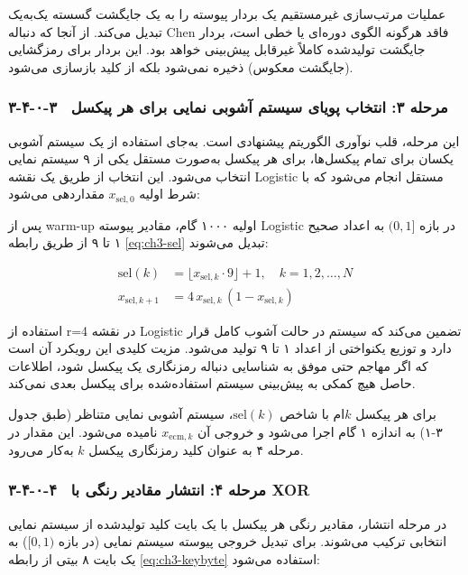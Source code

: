 عملیات مرتب‌سازی غیرمستقیم یک بردار پیوسته را به یک جایگشت گسسته یک‌به‌یک تبدیل می‌کند. از آنجا که دنباله ‎Chen‎ فاقد هرگونه الگوی دوره‌ای یا خطی است، بردار جایگشت تولیدشده کاملاً غیرقابل پیش‌بینی خواهد بود.  این بردار برای رمزگشایی (جایگشت معکوس) ذخیره نمی‌شود بلکه از کلید بازسازی می‌شود.

\subsubsection{۳-۴-۰-۳  مرحله ۳: انتخاب پویای سیستم آشوبی نمایی برای هر پیکسل}

این مرحله، قلب نوآوری الگوریتم پیشنهادی است. به‌جای استفاده از یک سیستم آشوبی یکسان برای تمام پیکسل‌ها، برای هر پیکسل به‌صورت مستقل یکی از ۹ سیستم نمایی انتخاب می‌شود. این انتخاب از طریق یک نقشه ‎Logistic‎ مستقل انجام می‌شود که با شرط اولیه $x_{\mathrm{sel},0}$ مقداردهی می‌شود:

پس از ‎warm-up‎ اولیه ۱۰۰۰ گام، مقادیر پیوسته ‎Logistic‎ در بازه $(0,1]$ به اعداد صحیح ۱ تا ۹ از طریق رابطه \eqref{eq:ch3-sel} تبدیل می‌شوند:

\begin{align}
\mathrm{sel}(k) &= \lfloor x_{\mathrm{sel},k} \cdot 9 \rfloor + 1, \quad k=1,2,\ldots,N \\
x_{\mathrm{sel},k+1} &= 4\,x_{\mathrm{sel},k}\,(1-x_{\mathrm{sel},k})
\label{eq:ch3-sel}
\end{align}

استفاده از ‎r=4‎ در نقشه ‎Logistic‎ تضمین می‌کند که سیستم در حالت آشوب کامل قرار دارد و توزیع یکنواختی از اعداد ۱ تا ۹ تولید می‌شود. مزیت کلیدی این رویکرد آن است که اگر مهاجم حتی موفق به شناسایی دنباله رمزنگاری یک پیکسل شود، اطلاعات حاصل هیچ کمکی به پیش‌بینی سیستم استفاده‌شده برای پیکسل بعدی نمی‌کند\cite{ref5}.

برای هر پیکسل $k$ام با شاخص $\mathrm{sel}(k)$، سیستم آشوبی نمایی متناظر (طبق جدول ۳-۱) به اندازه ۱ گام اجرا می‌شود و خروجی آن $x_{\mathrm{ecm},k}$ نامیده می‌شود. این مقدار در مرحله ۴ به عنوان کلید رمزنگاری پیکسل $k$ به‌کار می‌رود.

\subsubsection{۳-۴-۰-۴  مرحله ۴: انتشار مقادیر رنگی با  ‎XOR‎}

در مرحله انتشار، مقادیر رنگی هر پیکسل با یک بایت کلید تولیدشده از سیستم نمایی انتخابی ترکیب می‌شوند. برای تبدیل خروجی پیوسته سیستم نمایی (در بازه $[0,1)$) به یک بایت ۸ بیتی از رابطه \eqref{eq:ch3-keybyte} استفاده می‌شود:

